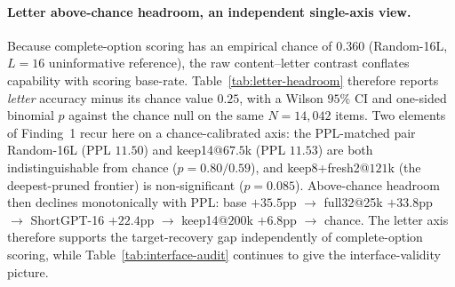 %

\paragraph{Letter above-chance headroom, an independent single-axis view.}
Because complete-option scoring has an empirical chance of $0.360$ (Random-16L, $L{=}16$
uninformative reference), the raw content--letter contrast conflates capability with
scoring base-rate. Table~\ref{tab:letter-headroom} therefore reports \emph{letter} accuracy
minus its chance value $0.25$, with a Wilson $95\%$ CI and one-sided binomial $p$ against
the chance null on the same $N{=}14{,}042$ items. Two elements of Finding~1 recur here on
a chance-calibrated axis: the PPL-matched pair Random-16L (PPL $11.50$) and
keep14@$67.5$k (PPL $11.53$) are both indistinguishable from chance
($p{=}0.80/0.59$), and keep8+fresh2@$121$k (the deepest-pruned frontier) is
non-significant ($p{=}0.085$). Above-chance headroom then declines monotonically with
PPL: base $+35.5$pp $\to$ full32@25k $+33.8$pp $\to$ ShortGPT-16 $+22.4$pp $\to$
keep14@$200$k $+6.8$pp $\to$ chance. The letter axis therefore supports the
target-recovery gap independently of complete-option scoring, while
Table~\ref{tab:interface-audit} continues to give the interface-validity picture.
